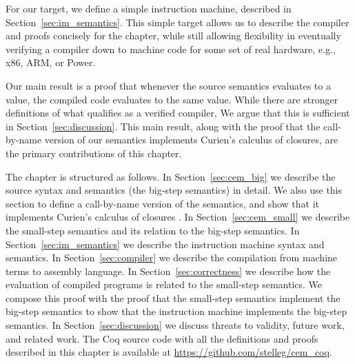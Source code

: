 For our target, we define a simple instruction machine, described in
Section~\ref{sec:im_semantics}. This simple target allows us to describe the
compiler and proofs concisely for the chapter, while still allowing
flexibility in eventually verifying a compiler down to machine code for some
set of real hardware, e.g., x86, ARM, or Power. 

Our main result is a proof that whenever the source semantics evaluates to a
value, the compiled code evaluates to the same value. While there are stronger
definitions of what qualifies as a verified compiler, We argue that this is
sufficient in Section~\ref{sec:discussion}. This main result, along with the
proof that the call-by-name version of our semantics implements Curien's
calculus of closures, are the primary contributions of this chapter. 

The chapter is structured as follows. In Section~\ref{sec:cem_big} we describe
the source syntax and semantics (the big-step \ce semantics) in detail.  We also
use this section to define a call-by-name version of the semantics, and show
that it implements Curien's calculus of closures \cite{curien1991abstract}.  In
Section~\ref{sec:cem_small} we describe the small-step \ce semantics and its
relation to the big-step semantics. In Section~\ref{sec:im_semantics} we describe
the instruction machine syntax and semantics. In Section~\ref{sec:compiler} we
describe the compilation from machine terms to assembly language. In
Section~\ref{sec:correctness} we describe how the evaluation of compiled programs
is related to the small-step \ce semantics. We compose this proof with the proof
that the small-step semantics implement the big-step semantics to show that the
instruction machine implements the big-step semantics. In
Section~\ref{sec:discussion} we discuss threats to validity, future work, and
related work. The Coq source code with all the definitions and proofs described
in this chapter is available at \url{https://github.com/stelleg/cem\_coq}. 
